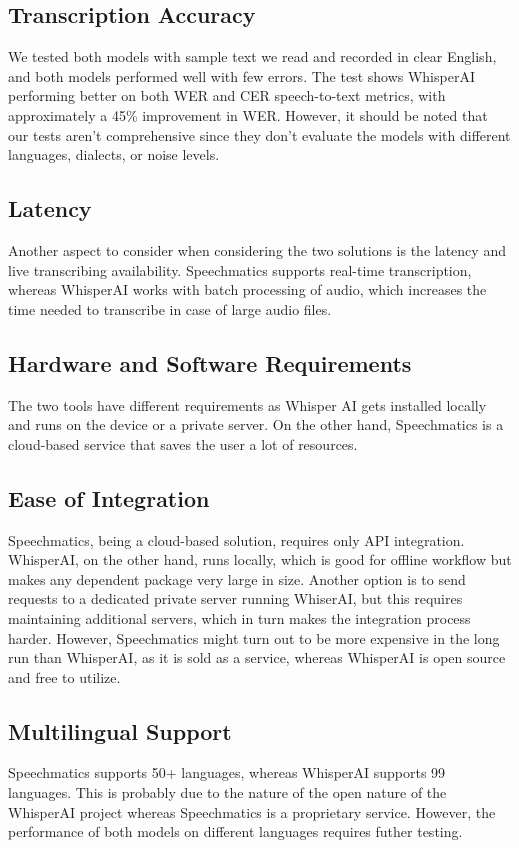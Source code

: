 \documentclass{article}
\begin{document}
\subsection{Transcription Accuracy}
We tested both models with sample text we read and recorded in clear English, and both models performed well with few errors. The test shows WhisperAI performing better on both WER and CER speech-to-text metrics, with approximately a 45\% improvement in WER. However, it should be noted that our tests aren’t comprehensive since they don’t evaluate the models with different languages, dialects, or noise levels. 
\subsection{Latency}
Another aspect to consider when considering the two solutions is the latency and live transcribing availability. Speechmatics supports real-time transcription, whereas WhisperAI works with batch processing of audio, which increases the time needed to transcribe in case of large audio files. 

\subsection{Hardware and Software Requirements}
The two tools have different requirements as Whisper AI gets installed locally and runs on the device or a private server. On the other hand, Speechmatics is a cloud-based service that saves the user a lot of resources.
\subsection{Ease of Integration}
Speechmatics, being a cloud-based solution, requires only API integration. WhisperAI, on the other hand, runs locally, which is good for offline workflow but makes any dependent package very large in size. Another option is to send requests to a dedicated private server running WhiserAI, but this requires maintaining additional servers, which in turn makes the integration process harder. However, Speechmatics might turn out to be more expensive in the long run than WhisperAI, as it is sold as a service, whereas WhisperAI is open source and free to utilize. 

\subsection{Multilingual Support}
Speechmatics supports 50+ languages, whereas WhisperAI supports 99 languages. This is probably due to the nature of the open nature of the WhisperAI project whereas Speechmatics is a proprietary service. However, the performance of both models on different languages requires futher testing.
\end{document}
